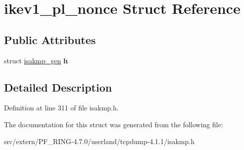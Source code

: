 \hypertarget{structikev1__pl__nonce}{
\section{ikev1\_\-pl\_\-nonce Struct Reference}
\label{structikev1__pl__nonce}
}
\subsection*{Public Attributes}
\begin{DoxyCompactItemize}
\item 
\hypertarget{structikev1__pl__nonce_abb47c24464c2cc60df41f25eddcda230}{
struct \hyperlink{structisakmp__gen}{isakmp\_\-gen} {\bfseries h}}
\label{structikev1__pl__nonce_abb47c24464c2cc60df41f25eddcda230}

\end{DoxyCompactItemize}


\subsection{Detailed Description}


Definition at line 311 of file isakmp.h.



The documentation for this struct was generated from the following file:\begin{DoxyCompactItemize}
\item 
src/extern/PF\_\-RING-\/4.7.0/userland/tcpdump-\/4.1.1/isakmp.h\end{DoxyCompactItemize}
